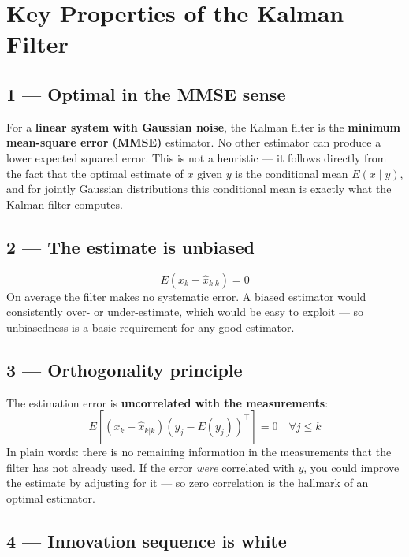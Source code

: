 \documentclass[12pt, a4paper]{article}
\begin{document}
\clearpage
\section*{Key Properties of the Kalman Filter}

\subsection*{1 --- Optimal in the MMSE sense}

For a \textbf{linear system with Gaussian noise}, the Kalman filter
is the \textbf{minimum mean-square error (MMSE)} estimator.
No other estimator can produce a lower expected squared error.
This is not a heuristic --- it follows directly from the fact that
the optimal estimate of $x$ given $y$ is the conditional mean
$E(x \mid y)$, and for jointly Gaussian distributions this
conditional mean is exactly what the Kalman filter computes.

\subsection*{2 --- The estimate is unbiased}

\[
  E(x_k - \hat{x}_{k|k}) = 0
\]
On average the filter makes no systematic error.
A biased estimator would consistently over- or under-estimate,
which would be easy to exploit --- so unbiasedness is a basic
requirement for any good estimator.

\subsection*{3 --- Orthogonality principle}

The estimation error is \textbf{uncorrelated with the measurements}:
\[
  E\!\left[(x_k - \hat{x}_{k|k})(y_j - E(y_j))^\top\right] = 0
  \quad \forall j \leq k
\]
In plain words: there is no remaining information in the measurements
that the filter has not already used.
If the error \emph{were} correlated with $y$, you could improve the
estimate by adjusting for it --- so zero correlation is the hallmark
of an optimal estimator.

\subsection*{4 --- Innovation sequence is white}
\end{document}
